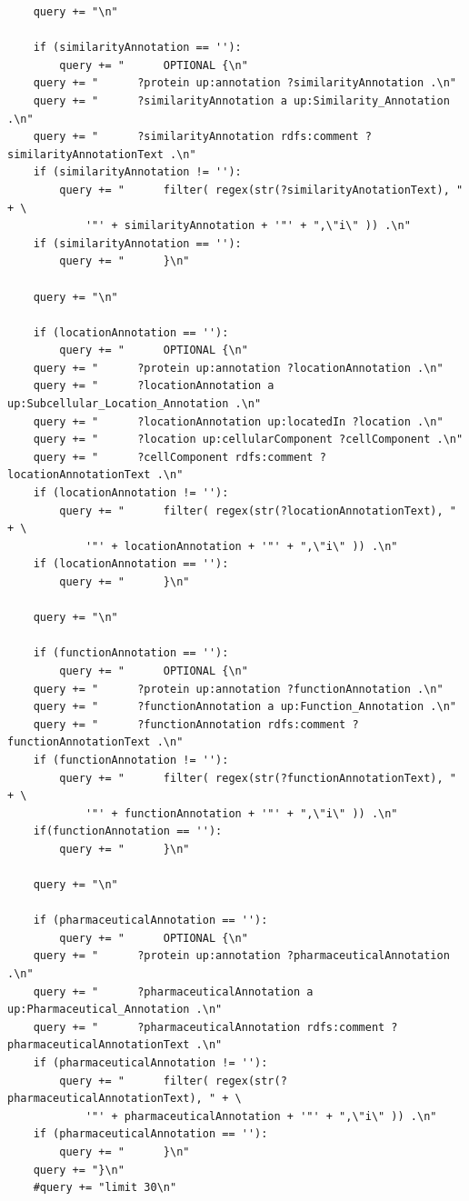 \documentclass[12pt]{article}
\begin{document}
\begin{Verbatim}
    query += "\n"

    if (similarityAnnotation == ''):
        query += "      OPTIONAL {\n"
    query += "      ?protein up:annotation ?similarityAnnotation .\n"
    query += "      ?similarityAnnotation a up:Similarity_Annotation .\n"
    query += "      ?similarityAnnotation rdfs:comment ?similarityAnnotationText .\n"
    if (similarityAnnotation != ''):
        query += "      filter( regex(str(?similarityAnotationText), " + \
            '"' + similarityAnnotation + '"' + ",\"i\" )) .\n"
    if (similarityAnnotation == ''):
        query += "      }\n"

    query += "\n"

    if (locationAnnotation == ''):
        query += "      OPTIONAL {\n"
    query += "      ?protein up:annotation ?locationAnnotation .\n"
    query += "      ?locationAnnotation a up:Subcellular_Location_Annotation .\n"
    query += "      ?locationAnnotation up:locatedIn ?location .\n"
    query += "      ?location up:cellularComponent ?cellComponent .\n"
    query += "      ?cellComponent rdfs:comment ?locationAnnotationText .\n"
    if (locationAnnotation != ''):
        query += "      filter( regex(str(?locationAnnotationText), " + \
            '"' + locationAnnotation + '"' + ",\"i\" )) .\n"
    if (locationAnnotation == ''):
        query += "      }\n"

    query += "\n"

    if (functionAnnotation == ''):
        query += "      OPTIONAL {\n"
    query += "      ?protein up:annotation ?functionAnnotation .\n"
    query += "      ?functionAnnotation a up:Function_Annotation .\n"
    query += "      ?functionAnnotation rdfs:comment ?functionAnnotationText .\n"
    if (functionAnnotation != ''):
        query += "      filter( regex(str(?functionAnnotationText), " + \
            '"' + functionAnnotation + '"' + ",\"i\" )) .\n"
    if(functionAnnotation == ''):
        query += "      }\n"

    query += "\n"

    if (pharmaceuticalAnnotation == ''):
        query += "      OPTIONAL {\n"
    query += "      ?protein up:annotation ?pharmaceuticalAnnotation .\n"
    query += "      ?pharmaceuticalAnnotation a up:Pharmaceutical_Annotation .\n"
    query += "      ?pharmaceuticalAnnotation rdfs:comment ?pharmaceuticalAnnotationText .\n"
    if (pharmaceuticalAnnotation != ''):
        query += "      filter( regex(str(?pharmaceuticalAnnotationText), " + \
            '"' + pharmaceuticalAnnotation + '"' + ",\"i\" )) .\n"
    if (pharmaceuticalAnnotation == ''):
        query += "      }\n"
    query += "}\n"
    #query += "limit 30\n"


\end{Verbatim}
\end{document}
